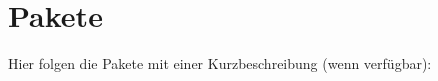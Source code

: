 \section{Pakete}
Hier folgen die Pakete mit einer Kurzbeschreibung (wenn verfügbar)\+:\begin{DoxyCompactList}
\item{}
\end{DoxyCompactList}
